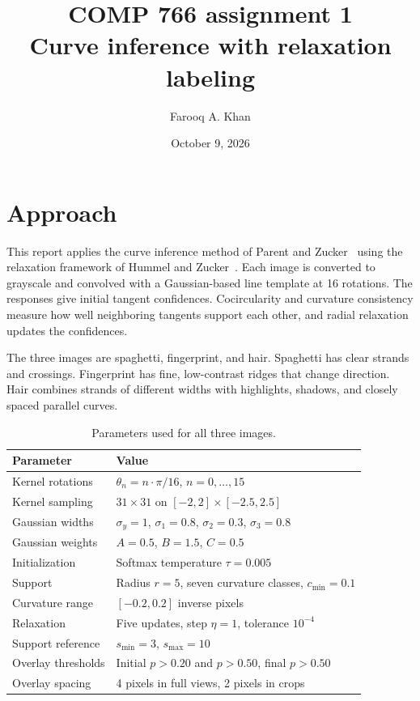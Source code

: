 \documentclass[10pt,letterpaper]{article}
\title{COMP 766 assignment 1\\Curve inference with relaxation labeling}
\author{Farooq A. Khan} %
\date{October 9, 2026}
\begin{document}
\maketitle
\vspace{-2em}

\section{Approach}
This report applies the curve inference method of Parent and
Zucker~\cite{parent1989} using the relaxation framework of Hummel and
Zucker~\cite{hummel1983}. Each image is converted to grayscale and convolved
with a Gaussian-based line template at 16 rotations. The responses give
initial tangent confidences. Cocircularity and curvature consistency measure
how well neighboring tangents support each other, and radial relaxation
updates the confidences.

The three images are spaghetti, fingerprint, and hair. Spaghetti has clear
strands and crossings. Fingerprint has fine, low-contrast ridges that change
direction. Hair combines strands of different widths with highlights,
shadows, and closely spaced parallel curves.

\begin{table}[!htbp]
\centering\small
\begin{tabular}{ll}
\toprule
Parameter & Value \\
\midrule
Kernel rotations & $\theta_n=n\cdot \pi/16$, $n=0,\ldots,15$ \\
Kernel sampling & $31\times31$ on $[-2,2]\times[-2.5,2.5]$ \\
Gaussian widths & $\sigma_y=1$, $\sigma_1=0.8$, $\sigma_2=0.3$, $\sigma_3=0.8$ \\
Gaussian weights & $A=0.5$, $B=1.5$, $C=0.5$ \\
Initialization & Softmax temperature $\tau=0.005$ \\
Support & Radius $r=5$, seven curvature classes, $c_{\min}=0.1$ \\
Curvature range & $[-0.2,0.2]$ inverse pixels \\
Relaxation & Five updates, step $\eta=1$, tolerance $10^{-4}$ \\
Support reference & $s_{\min}=3$, $s_{\max}=10$ \\
Overlay thresholds & Initial $p>0.20$ and $p>0.50$, final $p>0.50$ \\
Overlay spacing & 4 pixels in full views, 2 pixels in crops \\
\bottomrule
\end{tabular}
\caption{Parameters used for all three images.}
\label{tab:parameters}
\end{table}
\end{document}
